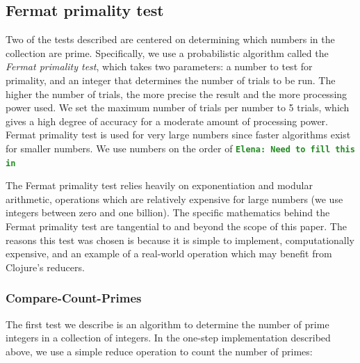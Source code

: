 \documentclass[12pt]{article}
\newcommand{\comment}[1]{{\bf \tt  {#1}}}
\newcommand{\emcomment}[1]{\textcolor{ForestGreen}{\comment{Elena: {#1}}}}
\newcommand{\joecomment}[1]{\textcolor{JoesGold}{\comment{Joe: {#1}}}}
\begin{document}
\subsection{Fermat primality test}\label{sec:fermat}
Two of the tests described are centered on determining which numbers in the collection are prime. Specifically, we use a probabilistic algorithm called the \emph{Fermat primality test}, which takes two parameters: a number to test for primality, and an integer that determines the number of trials to be run. The higher the number of trials, the more precise the result and the more processing power used. We set the maximum number of trials per number to 5 trials, which gives a high degree of accuracy for a moderate amount of processing power. Fermat primality test is used for very large numbers since faster algorithms exist for smaller numbers. We use numbers on the order of \emcomment{Need to fill this in}

The Fermat primality test relies heavily on exponentiation and modular arithmetic, operations which are relatively expensive for large numbers (we use integers between zero and one billion). The specific mathematics behind the Fermat primality test are tangential to and beyond the scope of this paper. The reasons this test was chosen is 
because it is simple to implement, computationally expensive, and an example of a real-world operation which may benefit from Clojure's reducers. 

\subsubsection{Compare-Count-Primes}\label{sec:count-primes}
The first test we describe is an algorithm to determine the number of prime integers in a  collection of integers. In the one-step implementation described above, we use a simple reduce operation to count the number of primes:
\end{document}
